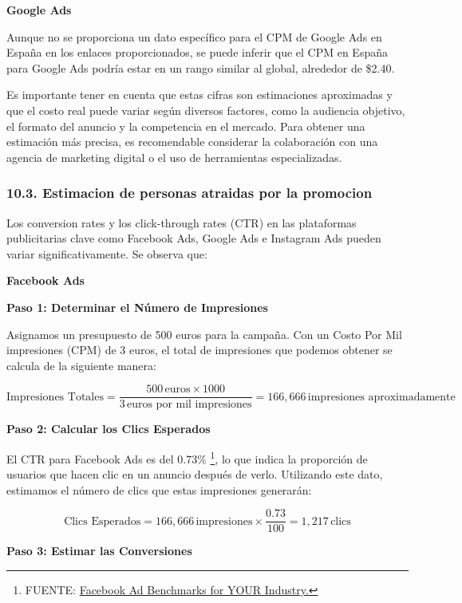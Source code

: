 \documentclass[
]{article}
\begin{document}
\textbf{Google Ads}

Aunque no se proporciona un dato específico para el CPM de Google Ads en
España en los enlaces proporcionados, se puede inferir que el CPM en
España para Google Ads podría estar en un rango similar al global,
alrededor de \$2.40.

Es importante tener en cuenta que estas cifras son estimaciones
aproximadas y que el costo real puede variar según diversos factores,
como la audiencia objetivo, el formato del anuncio y la competencia en
el mercado. Para obtener una estimación más precisa, es recomendable
considerar la colaboración con una agencia de marketing digital o el uso
de herramientas especializadas.

\subsubsection{10.3. Estimacion de personas atraidas por la
promocion}\label{estimacion-de-personas-atraidas-por-la-promocion}

Los conversion rates y los click-through rates (CTR) en las plataformas
publicitarias clave como Facebook Ads, Google Ads e Instagram Ads pueden
variar significativamente. Se observa que:

\textbf{Facebook Ads}

\textbf{Paso 1: Determinar el Número de Impresiones}

Asignamos un presupuesto de 500 euros para la campaña. Con un Costo Por
Mil impresiones (CPM) de 3 euros, el total de impresiones que podemos
obtener se calcula de la siguiente manera:

\[
\text{Impresiones Totales} = \frac{500 \, \text{euros} \times 1000}{3 \, \text{euros por mil impresiones}} = 166,666 \, \text{impresiones aproximadamente}
\]

\textbf{Paso 2: Calcular los Clics Esperados}

El CTR para Facebook Ads es del 0.73\% \footnote{FUENTE:
  \href{https://www.wordstream.com/blog/ws/2017/02/28/facebook-advertising-benchmarks}{Facebook
  Ad Benchmarks for YOUR Industry.}}, lo que indica la proporción de
usuarios que hacen clic en un anuncio después de verlo. Utilizando este
dato, estimamos el número de clics que estas impresiones generarán:

\[
\text{Clics Esperados} = 166,666 \, \text{impresiones} \times \frac{0.73}{100} = 1,217 \, \text{clics}
\]

\textbf{Paso 3: Estimar las Conversiones}
\end{document}

